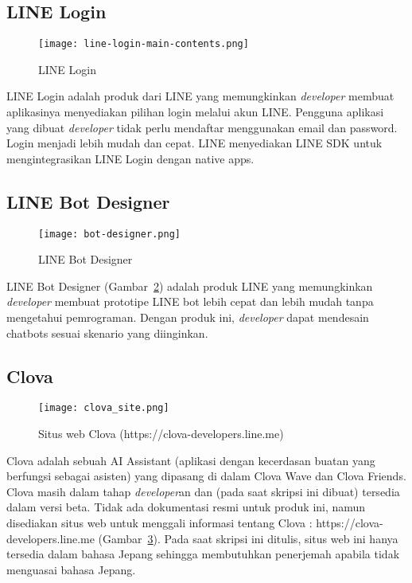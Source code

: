 \subsection{LINE Login}

\begin{figure}[H]
	\centering  
	\texttt{[image: line-login-main-contents.png]}  
	\caption[LINE Login]{LINE Login} 
	\label{fig:line-login} 
\end{figure}

LINE Login adalah produk dari LINE yang memungkinkan \textit{developer} membuat aplikasinya menyediakan pilihan login melalui akun LINE. Pengguna aplikasi yang dibuat \textit{developer} tidak perlu mendaftar menggunakan email dan password. Login menjadi lebih mudah dan cepat. LINE menyediakan LINE SDK untuk mengintegrasikan LINE Login dengan native apps.

\subsection{LINE Bot Designer}

\begin{figure}[H]
	\centering  
	\texttt{[image: bot-designer.png]}  
	\caption[LINE Bot Designer]{LINE Bot Designer} 
	\label{fig:bot-designer} 
\end{figure}

LINE Bot Designer (Gambar~\ref{fig:bot-designer}) adalah produk LINE yang memungkinkan \textit{developer} membuat prototipe LINE bot lebih cepat dan lebih mudah tanpa mengetahui pemrograman. Dengan produk ini, \textit{developer} dapat mendesain chatbots sesuai skenario yang diinginkan.

\subsection{Clova}

\begin{figure}[H]
	\centering  
	\texttt{[image: clova\_site.png]}  
	\caption[Situs web Clova]{Situs web Clova (https://clova-developers.line.me)} 
	\label{fig:clova_site} 
\end{figure}

Clova adalah sebuah AI Assistant (aplikasi dengan kecerdasan buatan yang berfungsi sebagai asisten) yang dipasang di dalam Clova Wave dan Clova Friends. Clova masih dalam tahap \textit{developer}an dan (pada saat skripsi ini dibuat) tersedia dalam versi beta. Tidak ada dokumentasi resmi untuk produk ini, namun disediakan situs web untuk menggali informasi tentang Clova : https://clova-developers.line.me (Gambar~\ref{fig:clova_site}). Pada saat skripsi ini ditulis, situs web ini hanya tersedia dalam bahasa Jepang sehingga membutuhkan penerjemah apabila tidak menguasai bahasa Jepang.

